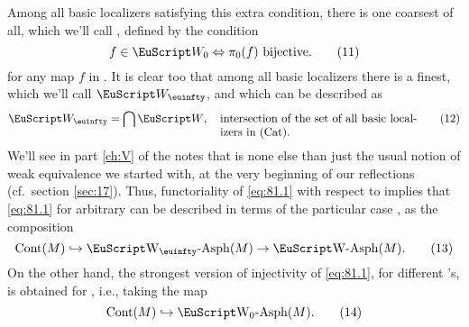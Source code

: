 Among all basic localizers satisfying this extra condition, there is
one coarsest of all, which we'll call \scrWz, defined by the
condition
\begin{equation}
  \label{eq:81.11}
  f\in\scrWz \Leftrightarrow \text{$\piz(f)$ bijective.}\tag{11}
\end{equation}
for any map $f$ in \Cat. It is clear too that among all basic
localizers there is a finest, which we'll call $\scrWoo$, and which
can be described as
\begin{equation}
  \label{eq:81.12}
  \scrWoo=\bigcap\scrW, \quad\parbox[t]{0.5\textwidth}{intersection
    of the set of all basic localizers in \Cat.}\tag{12}
\end{equation}
We'll see in part \ref{ch:V}
of the notes that \scrWoo{} is none else than just the usual notion of
weak equivalence we started with, at the very beginning of our
reflections (cf.\ section \ref{sec:17}). Thus, functoriality of
\eqref{eq:81.1} with respect to \scrW{} implies that \eqref{eq:81.1}
for arbitrary \scrW{} can be described in terms of the particular case
\scrWoo, as the composition
\begin{equation}
  \label{eq:81.13}
  \Cont(M) \hookrightarrow \WooAsph(M) \to \WAsph(M).\tag{13}
\end{equation}
On the other hand, the strongest version of injectivity of
\eqref{eq:81.1}, for different \scrW's, is obtained for \scrWz,
i.e., taking the map
\begin{equation}
  \label{eq:81.14}
  \Cont(M) \hookrightarrow \WzAsph(M).\tag{14}
\end{equation}

